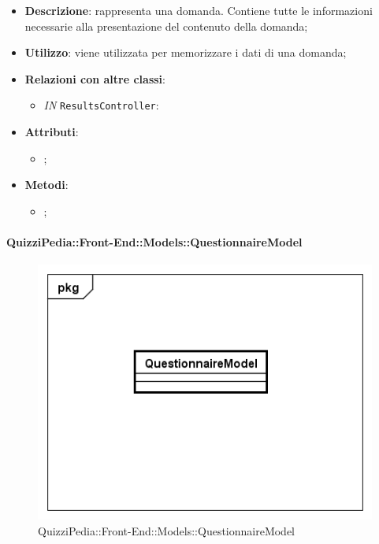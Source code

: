 		\begin{itemize}
			\item \textbf{Descrizione}: rappresenta una domanda. Contiene tutte le informazioni necessarie alla
			presentazione del contenuto della domanda;
			\item \textbf{Utilizzo}: viene utilizzata per memorizzare i dati di una domanda;
			\item \textbf{Relazioni con altre classi}: 
			\begin{itemize}

				\item \textit{IN} \texttt{ResultsController}:
			\end{itemize}
			\item \textbf{Attributi}: 
			\begin{itemize}
				\item ;
			\end{itemize}
			\item \textbf{Metodi}: 
			\begin{itemize}
				\item ;
			\end{itemize}
		\end{itemize}
		
		\paragraph{QuizziPedia::Front-End::Models::QuestionnaireModel}
		
		\label{QuizziPedia::Front-End::Models::QuestionnaireModel}
		
		\begin{figure}[h]
			\centering
			\includegraphics[scale=0.5,keepaspectratio]{UML/Classi/Front-End/QuizziPedia_Front-end_Models_QuestionnaireModel.png}
			\caption{QuizziPedia::Front-End::Models::QuestionnaireModel}
		\end{figure}
		

